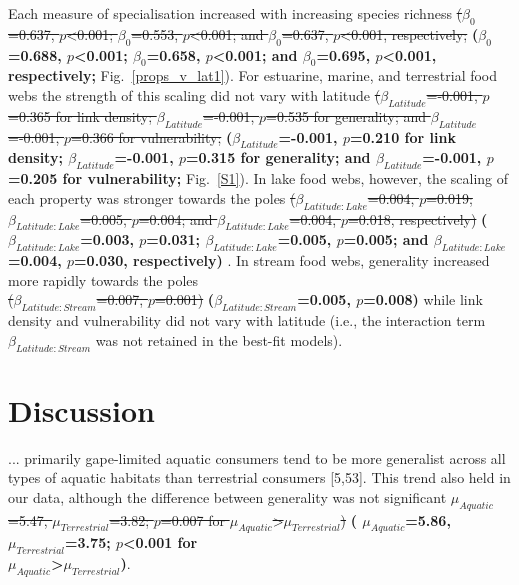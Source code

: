 \documentclass[12pt]{article}
\begin{document}
\begin{spacing}{2.0}
    Each measure of specialisation increased with increasing
    species richness 
    \st{($\beta_0$=0.637, $p$\textless0.001; $\beta_0$=0.553,
    $p$\textless0.001; and $\beta_0$=0.637, $p$\textless0.001, respectively;}
    \textbf{($\beta_0$=0.688, $p$\textless0.001; $\beta_0$=0.658,
    $p$\textless0.001; and $\beta_0$=0.695, $p$\textless0.001, respectively;}
    Fig.~\ref{props_v_lat1}). For estuarine, marine, and terrestrial food webs the
    strength of this scaling did not vary with latitude
    \st{($\beta_{Latitude}$=-0.001, $p$=0.365 for link density;
    $\beta_{Latitude}$=-0.001, $p$=0.535 for generality; and
    $\beta_{Latitude}$=-0.001, $p$=0.366 for vulnerability;}
    \textbf{($\beta_{Latitude}$=-0.001, $p$=0.210 for link density;
    $\beta_{Latitude}$=-0.001, $p$=0.315 for generality; and
    $\beta_{Latitude}$=-0.001, $p$=0.205 for vulnerability;} 
    Fig.~\ref{S1}). In
    lake food webs, however, the scaling of each property was stronger towards
    the poles 
    \st{($\beta_{Latitude:Lake}$=0.004, $p$=0.019;
    $\beta_{Latitude:Lake}$=0.005, $p$=0.004; and
    $\beta_{Latitude:Lake}$=0.004, $p$=0.018, respectively)}
    \textbf{($\beta_{Latitude:Lake}$=0.003, $p$=0.031;
    $\beta_{Latitude:Lake}$=0.005, $p$=0.005; and
    $\beta_{Latitude:Lake}$=0.004, $p$=0.030, respectively)}
    . In stream food
    webs, generality increased more rapidly towards the poles
    \\\st{($\beta_{Latitude:Stream}$=0.007, $p$=0.001)}
    \textbf{($\beta_{Latitude:Stream}$=0.005, $p$=0.008)}
    while link density and
    vulnerability did not vary with latitude (i.e., the interaction term 
    $\beta_{Latitude:Stream}$ was not retained in the best-fit models).    


\section*{Discussion}

    ... primarily gape-limited aquatic consumers tend to be more
    generalist across all types of aquatic habitats than terrestrial 
    consumers [5,53]. This trend also held in our data, although the difference between generality was not significant \st{
    $\mu_{Aquatic}$=5.47, $\mu_{Terrestrial}$=3.82; $p$=0.007 for $\mu_{Aquatic}$\textgreater$\mu_{Terrestrial}$)} \textbf{(
    $\mu_{Aquatic}$=5.86, $\mu_{Terrestrial}$=3.75; $p$\textless0.001 for 
    \\$\mu_{Aquatic}$\textgreater$\mu_{Terrestrial}$)}. 



\end{spacing}
\end{document}
